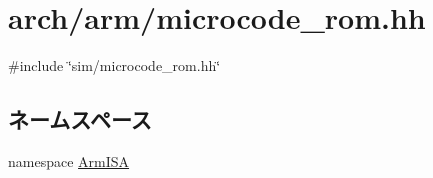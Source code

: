 \hypertarget{arch_2arm_2microcode__rom_8hh}{
\section{arch/arm/microcode\_\-rom.hh}
\label{arch_2arm_2microcode__rom_8hh}
}
{\ttfamily \#include \char`\"{}sim/microcode\_\-rom.hh\char`\"{}}\par
\subsection*{ネームスペース}
\begin{DoxyCompactItemize}
\item 
namespace \hyperlink{namespaceArmISA}{ArmISA}
\end{DoxyCompactItemize}
